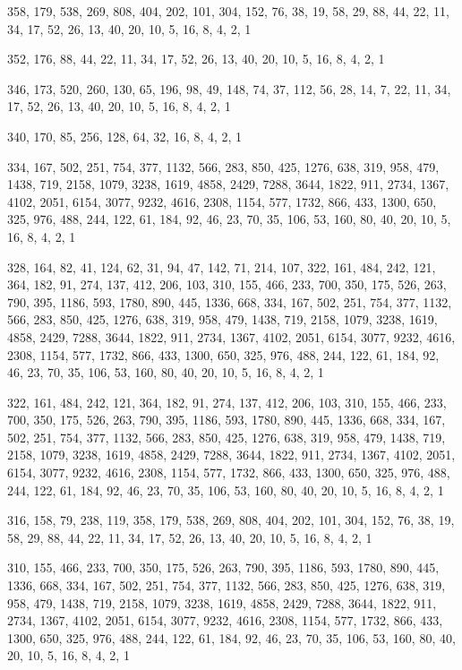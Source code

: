 \documentclass[12pt]{article}
\begin{document}
358, 179, 538, 269, 808, 404, 202, 101, 304, 152, 76, 38, 19, 58, 29, 88, 44, 22, 11, 34, 17, 52, 26, 13, 40, 20, 10, 5, 16, 8, 4, 2, 1

352, 176, 88, 44, 22, 11, 34, 17, 52, 26, 13, 40, 20, 10, 5, 16, 8, 4, 2, 1

346, 173, 520, 260, 130, 65, 196, 98, 49, 148, 74, 37, 112, 56, 28, 14, 7, 22, 11, 34, 17, 52, 26, 13, 40, 20, 10, 5, 16, 8, 4, 2, 1

340, 170, 85, 256, 128, 64, 32, 16, 8, 4, 2, 1

334, 167, 502, 251, 754, 377, 1132, 566, 283, 850, 425, 1276, 638, 319, 958, 479, 1438, 719, 2158, 1079, 3238, 1619, 4858, 2429, 7288, 3644, 1822, 911, 2734, 1367, 4102, 2051, 6154, 3077, 9232, 4616, 2308, 1154, 577, 1732, 866, 433, 1300, 650, 325, 976, 488, 244, 122, 61, 184, 92, 46, 23, 70, 35, 106, 53, 160, 80, 40, 20, 10, 5, 16, 8, 4, 2, 1

328, 164, 82, 41, 124, 62, 31, 94, 47, 142, 71, 214, 107, 322, 161, 484, 242, 121, 364, 182, 91, 274, 137, 412, 206, 103, 310, 155, 466, 233, 700, 350, 175, 526, 263, 790, 395, 1186, 593, 1780, 890, 445, 1336, 668, 334, 167, 502, 251, 754, 377, 1132, 566, 283, 850, 425, 1276, 638, 319, 958, 479, 1438, 719, 2158, 1079, 3238, 1619, 4858, 2429, 7288, 3644, 1822, 911, 2734, 1367, 4102, 2051, 6154, 3077, 9232, 4616, 2308, 1154, 577, 1732, 866, 433, 1300, 650, 325, 976, 488, 244, 122, 61, 184, 92, 46, 23, 70, 35, 106, 53, 160, 80, 40, 20, 10, 5, 16, 8, 4, 2, 1

322, 161, 484, 242, 121, 364, 182, 91, 274, 137, 412, 206, 103, 310, 155, 466, 233, 700, 350, 175, 526, 263, 790, 395, 1186, 593, 1780, 890, 445, 1336, 668, 334, 167, 502, 251, 754, 377, 1132, 566, 283, 850, 425, 1276, 638, 319, 958, 479, 1438, 719, 2158, 1079, 3238, 1619, 4858, 2429, 7288, 3644, 1822, 911, 2734, 1367, 4102, 2051, 6154, 3077, 9232, 4616, 2308, 1154, 577, 1732, 866, 433, 1300, 650, 325, 976, 488, 244, 122, 61, 184, 92, 46, 23, 70, 35, 106, 53, 160, 80, 40, 20, 10, 5, 16, 8, 4, 2, 1

316, 158, 79, 238, 119, 358, 179, 538, 269, 808, 404, 202, 101, 304, 152, 76, 38, 19, 58, 29, 88, 44, 22, 11, 34, 17, 52, 26, 13, 40, 20, 10, 5, 16, 8, 4, 2, 1

310, 155, 466, 233, 700, 350, 175, 526, 263, 790, 395, 1186, 593, 1780, 890, 445, 1336, 668, 334, 167, 502, 251, 754, 377, 1132, 566, 283, 850, 425, 1276, 638, 319, 958, 479, 1438, 719, 2158, 1079, 3238, 1619, 4858, 2429, 7288, 3644, 1822, 911, 2734, 1367, 4102, 2051, 6154, 3077, 9232, 4616, 2308, 1154, 577, 1732, 866, 433, 1300, 650, 325, 976, 488, 244, 122, 61, 184, 92, 46, 23, 70, 35, 106, 53, 160, 80, 40, 20, 10, 5, 16, 8, 4, 2, 1
\end{document}
